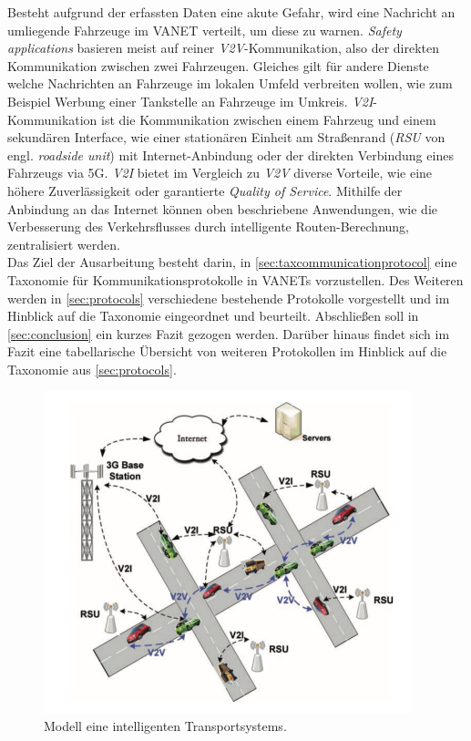 \documentclass[english,runningheads,a4paper]{llncs}[2018/03/10]
\begin{document}
Besteht aufgrund der erfassten Daten eine akute Gefahr, wird eine Nachricht an umliegende Fahrzeuge im VANET verteilt, um diese zu warnen.
\textit{Safety applications} basieren meist auf reiner \textit{V2V}-Kommunikation, also der direkten Kommunikation zwischen zwei Fahrzeugen.
Gleiches gilt für andere Dienste welche Nachrichten an Fahrzeuge im lokalen Umfeld verbreiten wollen, wie zum Beispiel Werbung einer Tankstelle an Fahrzeuge im Umkreis.
\textit{V2I}-Kommunikation ist die Kommunikation zwischen einem Fahrzeug und einem sekundären Interface, wie einer stationären Einheit am Straßenrand (\textit{RSU} von engl. \textit{roadside unit}) mit Internet-Anbindung oder der direkten Verbindung eines Fahrzeugs via 5G\@.
\textit{V2I} bietet im Vergleich zu \textit{V2V} diverse Vorteile, wie eine höhere Zuverlässigkeit oder garantierte \textit{Quality of Service}.
Mithilfe der Anbindung an das Internet können oben beschriebene Anwendungen, wie die Verbesserung des Verkehrsflusses durch intelligente Routen-Berechnung, zentralisiert werden\cite{conti2013mobile}.\\
Das Ziel der Ausarbeitung besteht darin, in \ref{sec:taxcommunicationprotocol} eine Taxonomie für Kommunikationsprotokolle in VANETs vorzustellen.
Des Weiteren werden in \ref{sec:protocols} verschiedene bestehende Protokolle vorgestellt und im Hinblick auf die Taxonomie eingeordnet und beurteilt.
Abschließen soll in \ref{sec:conclusion} ein kurzes Fazit gezogen werden.
Darüber hinaus findet sich im Fazit eine tabellarische Übersicht von weiteren Protokollen im Hinblick auf die Taxonomie aus \ref{sec:protocols}.

\begin{figure}[h]
  \centering
  \includegraphics[width=0.95\textwidth]{images/its-modell.png}
  \caption{Modell eine intelligenten Transportsystems\cite{conti2013mobile}.}
  \label{fig:its-modell}
\end{figure}
\end{document}
